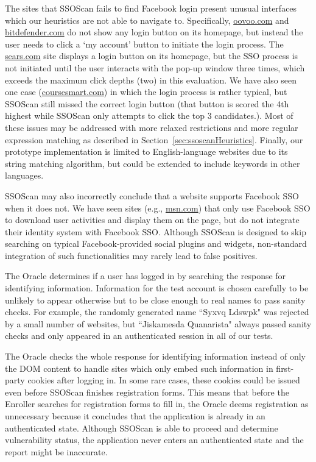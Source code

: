 The sites that SSOScan fails to find Facebook login present unusual interfaces which our heuristics are not able to navigate to.  Specifically, \url{oovoo.com} and \url{bitdefender.com} do not show any login button on its homepage, but instead the user needs to click a `my account' button to initiate the login process.  The \url{sears.com} site displays a login button on its homepage, but the SSO process is not initiated until the user interacts with the pop-up window three times, which exceeds the maximum click depths (two) in this evaluation.  We have also seen one case (\url{coursesmart.com}) in which the login process is rather typical, but SSOScan still missed the correct login button (that button is scored the  4th highest while SSOScan only attempts to click the top 3 candidates.).  Most of these issues may be addressed with more relaxed restrictions and more regular expression matching as described in Section~\ref{sec:ssoscanHeuristics}.  Finally, our prototype implementation is limited to English-language websites due to its string matching algorithm, but could be extended to include keywords in other languages.

SSOScan may also incorrectly conclude that a website supports Facebook SSO when it does not.  We have seen sites (e.g., \url{msn.com}) that only use Facebook SSO to download user activities and display them on the page, but do not integrate their identity system with Facebook SSO.  Although SSOScan is designed to skip searching on typical Facebook-provided social plugins and widgets, non-standard integration of such functionalities may rarely lead to false positives.

 The Oracle determines if a user has logged in by searching the response for identifying information.  Information for the test account is chosen carefully to be unlikely to appear otherwise but to be close enough to real names to pass sanity checks.  For example, the randomly generated name ``Syxvq Ldswpk" was rejected by a small number of websites,  but ``Jiskamesda Quanarista" always passed sanity checks and only appeared in an authenticated session in all of our tests.

The Oracle checks the whole response for identifying information instead of only the DOM content to handle sites which only embed such information in first-party cookies after logging in.  In some rare cases, these cookies could be issued even before SSOScan finishes registration forms.  This means that before the Enroller searches for registration forms to fill in, the Oracle deems registration as unnecessary because it concludes that the application is already in an authenticated state.  Although SSOScan is able to proceed and determine vulnerability status, the application never enters an authenticated state and the report might be inaccurate.

